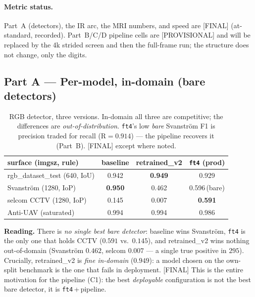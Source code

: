 \documentclass[11pt]{article}
\newcommand{\final}{{\small\textcolor{green!45!black}{[FINAL]}}}
\newcommand{\prov}{{\small\textcolor{orange!80!black}{[PROVISIONAL]}}}
\begin{document}
\paragraph{Metric status.} Part~A (detectors), the IR arc, the MRI numbers, and speed are
\final{} (at-standard, recorded). Part~B/C/D pipeline cells are \prov{} and will be replaced by
the 4k strided screen and then the full-frame run; the structure does not change, only the digits.

\subsection{Part A --- Per-model, in-domain (bare detectors)}
\label{sec:partA}

\begin{table}[h]\centering
\caption{RGB detector, three versions. In-domain all three are competitive; the differences are
\emph{out-of-distribution}. \texttt{ft4}'s low \emph{bare} Svanstr\"om F1 is precision traded for
recall (R$=0.914$) --- the pipeline recovers it (Part~B). \final{} except where noted.}
\begin{tabular}{lccc}
\toprule
surface (imgsz, rule) & baseline & retrained\_v2 & \texttt{ft4} (prod) \\
\midrule
rgb\_dataset\_test (640, IoU) & 0.942 & \textbf{0.949} & 0.929 \\ %
Svanstr\"om (1280, IoP) & \textbf{0.950} & 0.462 & 0.596\,(bare) \\ %
selcom CCTV (1280, IoP) & 0.145 & 0.007 & \textbf{0.591} \\ %
Anti-UAV (saturated) & 0.994 & 0.994 & 0.986 \\ %
\bottomrule
\end{tabular}
\end{table}

\noindent\textbf{Reading.} There is \emph{no single best bare detector}: baseline wins Svanstr\"om,
\texttt{ft4} is the only one that holds CCTV ($0.591$ vs.\ $0.145$), and retrained\_v2 wins nothing
out-of-domain (Svanstr\"om $0.462$, selcom $0.007$ --- a single true positive in $295$). Crucially,
retrained\_v2 is \emph{fine in-domain} ($0.949$): a model chosen on the own-split benchmark is the
one that fails in deployment. \final{} %
This is the entire motivation for the pipeline (C1): the best \emph{deployable} configuration is
not the best bare detector, it is \texttt{ft4}\,+\,pipeline.
\end{document}
